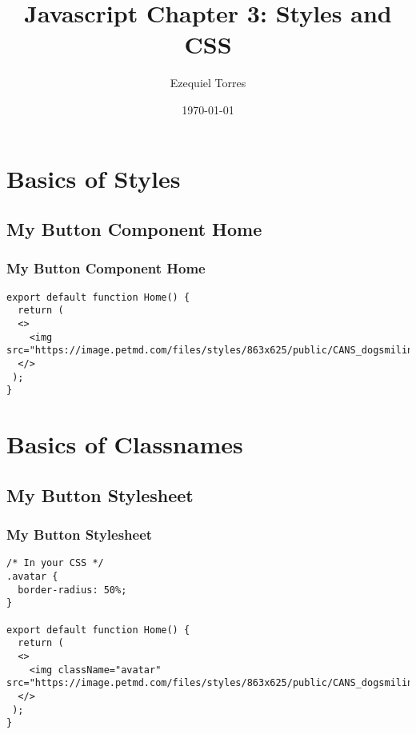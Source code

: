 \documentclass{beamer}
\begin{document}
\title{Javascript Chapter 3: Styles and CSS}
\author{Ezequiel Torres}
\date{\today}
\frame{\titlepage}

\section{Basics of Styles}

\begin{frame}[fragile]
\subsection{My Button Component Home}
\frametitle{My Button Component Home}
\begin{lstlisting}
export default function Home() {
  return (
  <>
    <img src="https://image.petmd.com/files/styles/863x625/public/CANS_dogsmiling_379727605.jpg"/>
  </>
 );
}\end{lstlisting}
\end{frame}

\section{Basics of Classnames}

\begin{frame}[fragile]
\subsection{My Button Stylesheet}
\frametitle{My Button Stylesheet}
\begin{lstlisting}
/* In your CSS */
.avatar {
  border-radius: 50%;
}

export default function Home() {
  return (
  <>
    <img className="avatar" src="https://image.petmd.com/files/styles/863x625/public/CANS_dogsmiling_379727605.jpg"/>
  </>
 );
}\end{lstlisting}
\end{frame}
\end{document}
